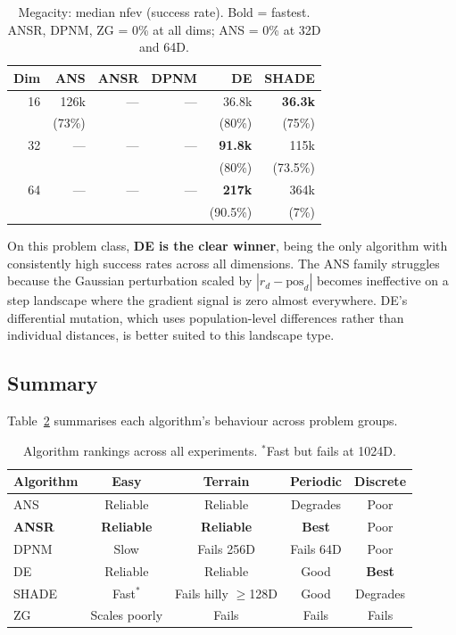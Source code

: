 \documentclass[11pt,a4paper]{article}
\begin{document}
\begin{table}[h]
\centering
\caption{Megacity: median nfev (success rate). Bold = fastest. ANSR, DPNM, ZG = 0\% at all dims; ANS = 0\% at 32D and 64D.}
\label{tab:megacity}
\begin{tabular}{@{}rrrrrr@{}}
\toprule
Dim & ANS & ANSR & DPNM & \textbf{DE} & SHADE \\
\midrule
16 & 126k  & --- & --- & 36.8k & \textbf{36.3k} \\
   & (73\%) &     &     & (80\%) & (75\%) \\
32 & ---   & --- & --- & \textbf{91.8k} & 115k \\
   &       &     &     & (80\%) & (73.5\%) \\
64 & ---   & --- & --- & \textbf{217k} & 364k \\
   &       &     &     & (90.5\%) & (7\%) \\
\bottomrule
\end{tabular}
\end{table}

On this problem class, \textbf{DE is the clear winner}, being the only algorithm with consistently high success rates across all dimensions. The ANS family struggles because the Gaussian perturbation scaled by $|r_d - \text{pos}_d|$ becomes ineffective on a step landscape where the gradient signal is zero almost everywhere. DE's differential mutation, which uses population-level differences rather than individual distances, is better suited to this landscape type.

\subsection{Summary}

Table~\ref{tab:summary} summarises each algorithm's behaviour across problem groups.

\begin{table}[h]
\centering
\caption{Algorithm rankings across all experiments. $^*$Fast but fails at 1024D.}
\label{tab:summary}
\begin{tabular}{@{}lcccc@{}}
\toprule
Algorithm & Easy & Terrain & Periodic & Discrete \\
\midrule
ANS       & Reliable & Reliable & Degrades & Poor \\
\textbf{ANSR} & \textbf{Reliable} & \textbf{Reliable} & \textbf{Best} & Poor \\
DPNM      & Slow     & Fails 256D & Fails 64D & Poor \\
DE        & Reliable & Reliable & Good     & \textbf{Best} \\
SHADE     & Fast$^*$ & Fails hilly $\geq$128D & Good & Degrades \\
ZG        & Scales poorly & Fails & Fails & Fails \\
\bottomrule
\end{tabular}
\end{table}
\end{document}
